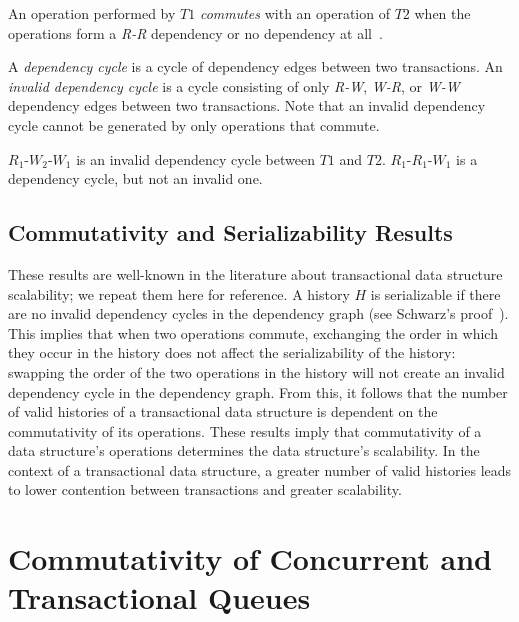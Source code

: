 \begin{defn}
    An operation performed by $T1$ \emph{commutes} with an operation of $T2$ when the operations form a \emph{R-R} dependency or no dependency at all~\cite{weihl}.
\end{defn}

\begin{defn}
    A \emph{dependency cycle} is a cycle of dependency edges between two transactions. An \emph{invalid dependency cycle} is a cycle consisting of only \emph{R-W}, \emph{W-R}, or \emph{W-W} dependency edges between two transactions. Note that an invalid dependency cycle cannot be generated by only operations that commute.
\end{defn}
\begin{eg}
    $R_1$-$W_2$-$W_1$ is an invalid dependency cycle between $T1$ and $T2$.
    $R_1$-$R_1$-$W_1$ is a dependency cycle, but not an invalid one.
\end{eg}

\subsection{Commutativity and Serializability Results}

These results are well-known in the literature about transactional data structure scalability; we repeat them here for reference.
A history $H$ is serializable if there are no invalid dependency cycles in the dependency graph (see Schwarz's proof~\cite{schwarz}). This implies that when two operations commute, exchanging the order in which they occur in the history does not affect the serializability of the history: swapping the order of the two operations in the history will not create an invalid dependency cycle in the dependency graph. From this, it follows that the number of valid histories of a transactional data structure is dependent on the commutativity of its operations.
These results imply that commutativity of a data structure's operations determines the data structure's scalability. In the context of a transactional data structure, a greater number of valid histories leads to lower contention between transactions and greater scalability. 

\section{Commutativity of Concurrent and Transactional Queues}

